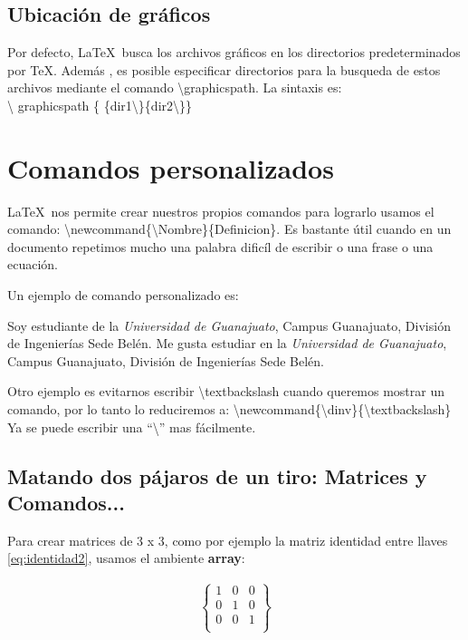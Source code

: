 \documentclass{article}
\begin{document}
\subsection{Ubicaci\'on de gr\'aficos}
Por defecto, \LaTeX\ busca los archivos gr\'aficos en los directorios predeterminados por \TeX. Adem\'as , es posible especificar directorios para la busqueda de estos archivos mediante el comando \textbackslash graphicspath. La sintaxis es:\\ 
\textbackslash
graphicspath \{ \{dir1\textbackslash \}\{dir2\textbackslash \}\} 



\section{Comandos personalizados} 
\LaTeX\ nos permite crear nuestros propios comandos para lograrlo usamos el comando:
\textbackslash newcommand\{\textbackslash Nombre\}\{Definicion\}. 
Es bastante \'util cuando en un documento repetimos mucho una palabra dific\'il de escribir o una frase o una ecuaci\'on. 

Un ejemplo de comando personalizado es: 

\newcommand{\UG}{\textit{
Universidad de Guanajuato}, 
Campus Guanajuato, 
Divisi\'on de Ingenier\'ias 
Sede Bel\'en}

Soy estudiante de la \UG. 
Me gusta estudiar en la \UG.


\medskip 
Otro ejemplo es evitarnos escribir \textbackslash textbackslash cuando 
queremos mostrar un comando, por lo tanto lo reduciremos a: 
\textbackslash newcommand\{\textbackslash dinv\}\{\textbackslash textbackslash\} 
\newcommand{\dinv}{\textbackslash}
Ya se puede escribir una ``\dinv'' mas f\'acilmente.

\subsection{Matando dos p\'ajaros de un tiro: Matrices y Comandos...}
Para crear matrices de 3 x 3, como por ejemplo la matriz identidad entre llaves \ref{eq:identidad2}, usamos el ambiente \textbf{array}:

\begin{eqnarray}
\left\{
\begin{array}{ccc}
1&0&0\\
0&1&0\\
0&0&1\\
\end{array}
\right\}
\label{eq:identidad2}
\end{eqnarray}
\end{document}
